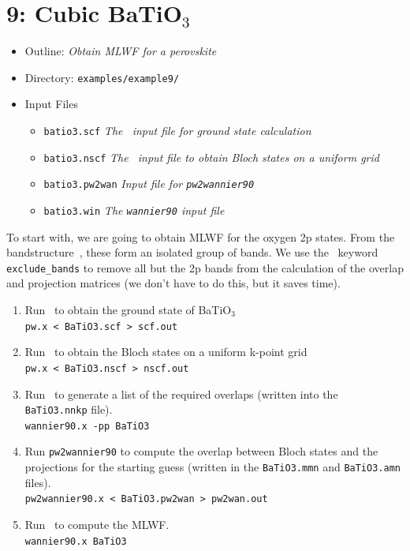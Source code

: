 \documentclass[a4paper,11pt,twoside]{article}
\begin{document}
\section*{9: Cubic BaTiO$_3$}
\begin{itemize}
\item{Outline: \it{Obtain MLWF for a perovskite}}
\item{Directory: {\tt examples/example9/}}
\item{Input Files}
\begin{itemize}
\item{ {\tt batio3.scf}  {\it The \pwscf\ input file for ground state
    calculation}} 
\item{ {\tt batio3.nscf}  {\it The \pwscf\ input file to obtain Bloch states
    on a uniform grid}} 
\item{ {\tt batio3.pw2wan}  {\it Input file for {\tt pw2wannier90}}}
\item{ {\tt  batio3.win}  {\it The {\tt wannier90} input file}}
\end{itemize}
\end{itemize}

 To start with, we are going to obtain MLWF for the oxygen 2p
  states. From the bandstructure~\cite{BaTiO3}, these form an isolated
  group of bands. We use the \wannier\ keyword {\tt exclude\_bands} to
  remove all but the 2p bands from the calculation of the overlap
  and projection matrices (we don't have to do this, but it saves time).

\begin{enumerate}
\item Run \pwscf\ to obtain the ground state of BaTiO$_3$\\
{\tt pw.x < BaTiO3.scf > scf.out}

\item Run \pwscf\ to obtain the Bloch states on a uniform k-point grid\\
{\tt pw.x < BaTiO3.nscf > nscf.out}

\item Run \wannier\ to generate a list of the required overlaps (written
  into the {\tt BaTiO3.nnkp} file).\\ 
{\tt wannier90.x -pp BaTiO3}

\item Run {\tt pw2wannier90} to compute the overlap between Bloch
  states and the projections for the starting guess (written in the
  {\tt BaTiO3.mmn} and {\tt BaTiO3.amn} files).\\  
{\tt pw2wannier90.x < BaTiO3.pw2wan > pw2wan.out}

\item Run \wannier\ to compute the MLWF.\\
{\tt wannier90.x BaTiO3}
\end{enumerate}
\end{document}
